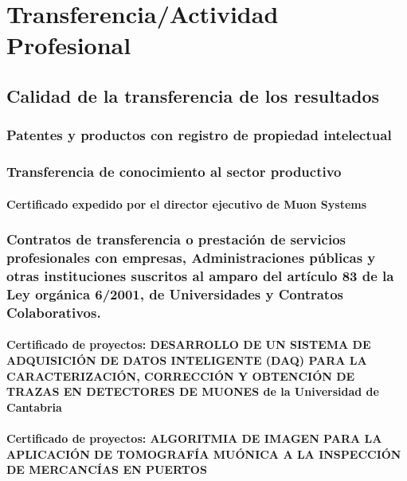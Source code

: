 \documentclass[a4paper, 11pt, twoside, openright]{report}
\begin{document}
\chapter{Transferencia/Actividad Profesional}

\section{Calidad de la transferencia de los resultados}

\subsection{Patentes y productos con registro de propiedad intelectual}

\subsection{Transferencia de conocimiento al sector productivo}

\subsubsection{Certificado expedido por el director ejecutivo de Muon Systems}


\subsection{Contratos de transferencia o prestación de servicios profesionales con empresas, Administraciones públicas y otras 	instituciones suscritos al amparo del artículo 83 de la Ley orgánica 6/2001, de Universidades y Contratos Colaborativos.}

\subsubsection{Certificado de proyectos: DESARROLLO DE UN SISTEMA DE ADQUISICIÓN DE DATOS INTELIGENTE (DAQ) PARA LA CARACTERIZACIÓN, CORRECCIÓN Y OBTENCIÓN DE TRAZAS EN DETECTORES DE MUONES de la Universidad de Cantabria}


\subsubsection{Certificado de proyectos: ALGORITMIA DE IMAGEN PARA LA APLICACIÓN DE TOMOGRAFÍA MUÓNICA A LA INSPECCIÓN DE MERCANCÍAS EN PUERTOS}

\end{document}

